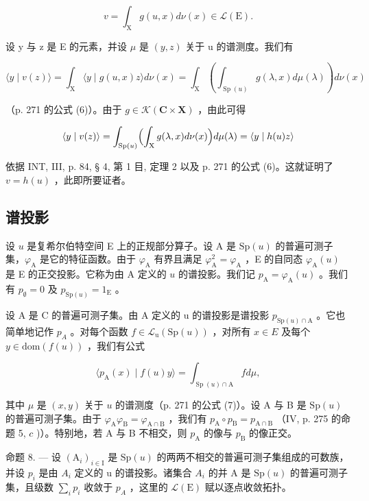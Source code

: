 \[
v = \int_ {\mathrm{X}} g (u, x) d \nu (x) \in \mathscr {L} (\mathrm{E}).
\]

设 y 与 z 是 E 的元素，并设 \(\mu\) 是 \((y, z)\) 关于 u 的谱测度。我们有

\[
\langle y \mid v (z) \rangle = \int_ {\mathrm{X}} \langle y \mid g (u, x) z \rangle d \nu (x) = \int_ {\mathrm{X}} \left(\int_ {\operatorname{Sp} (u)} g (\lambda , x) d \mu (\lambda)\right) d \nu (x)
\]

（p. 271 的公式 (6)）。由于 \(g \in \mathcal{K}(\mathbf{C} \times \mathbf{X})\) ，由此可得

\[
\langle y \mid v (z) \rangle = \int_ {\operatorname{Sp} (u)} \Bigl (\int_ {\mathrm{X}} g (\lambda , x) d \nu (x) \Bigr) d \mu (\lambda) = \langle y \mid h (u) z \rangle
\]

依据 INT, III, p. 84, § 4, 第 1 目, 定理 2 以及 p. 271 的公式 (6)。这就证明了 \(v = h(u)\) ，此即所要证者。

\subsection{谱投影}

设 \(u\) 是复希尔伯特空间 E 上的正规部分算子。设 A 是 \(\mathrm{Sp}(u)\) 的普遍可测子集，\(\varphi_{\mathrm{A}}\) 是它的特征函数。由于 \(\varphi_{\mathrm{A}}\) 有界且满足 \(\varphi_{\mathrm{A}}^{2} = \varphi_{\mathrm{A}}\) ，E 的自同态 \(\varphi_{\mathrm{A}}(u)\) 是 E 的正交投影。它称为由 A 定义的 \(u\) 的谱投影。我们记 \(p_{\mathrm{A}} = \varphi_{\mathrm{A}}(u)\) 。我们有 \(p_{\emptyset} = 0\) 及 \(p_{\mathrm{Sp}(u)} = 1_{\mathrm{E}}\) 。

设 A 是 C 的普遍可测子集。由 A 定义的 u 的谱投影是谱投影 \(p_{\mathrm{Sp}(u)\cap\mathrm{A}}\) 。它也简单地记作 \(p_{A}\) 。对每个函数 \(f \in \mathcal{L}_{\mathrm{u}}(\mathrm{Sp}(u))\) ，对所有 \(x \in E\) 及每个 \(y \in \mathrm{dom}(f(u))\) ，我们有公式

\[
\langle p _ {\mathrm{A}} (x) \mid f (u) y \rangle = \int_ {\operatorname{Sp} (u) \cap \mathrm{A}} f d \mu ,\tag{10}
\]

其中 \(\mu\) 是 \((x,y)\) 关于 \(u\) 的谱测度（p. 271 的公式 (7)）。设 A 与 B 是 \(\mathrm{Sp}(u)\) 的普遍可测子集。由于 \(\varphi_{\mathrm{A}}\varphi_{\mathrm{B}} = \varphi_{\mathrm{A}\cap \mathrm{B}}\) ，我们有 \(p_{\mathrm{A}} \circ p_{\mathrm{B}} = p_{\mathrm{A}\cap \mathrm{B}}\) （IV, p. 275 的命题 5, \(c\) )）。特别地，若 A 与 B 不相交，则 \(p_{\mathrm{A}}\) 的像与 \(p_{\mathrm{B}}\) 的像正交。

命题 8. --- 设 \((\mathrm{A}_{i})_{i\in\mathrm{I}}\) 是 \(\mathrm{Sp}(u)\) 的两两不相交的普遍可测子集组成的可数族，并设 \(p_{i}\) 是由 \(A_{i}\) 定义的 u 的谱投影。诸集合 \(A_{i}\) 的并 A 是 \(\mathrm{Sp}(u)\) 的普遍可测子集，且级数 \(\sum_{i}p_{i}\) 收敛于 \(p_{A}\) ，这里的 \(\mathcal{L}(\mathrm{E})\) 赋以逐点收敛拓扑。

